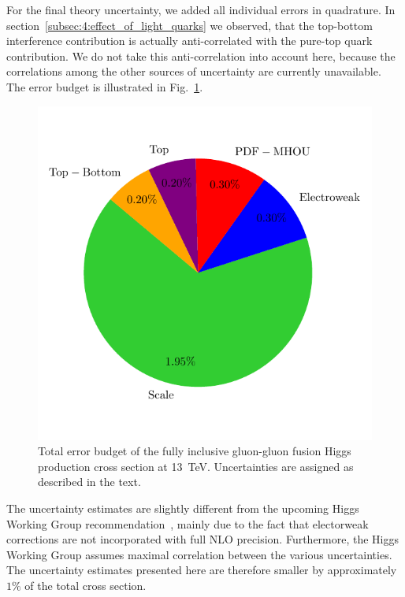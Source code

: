 For the final theory uncertainty, we added all individual errors in quadrature. In section~\ref{subsec:4:effect_of_light_quarks} we observed, that the top-bottom interference contribution is actually anti-correlated with the pure-top quark contribution. We do not take this anti-correlation into account here, because the correlations among the other sources of uncertainty are currently unavailable. The error budget is illustrated in Fig.~\ref{fig:6:error_budget}.
\begin{figure}[h]
\centering
\includegraphics[scale=0.8]{Images/error_budget_after.pdf}
\caption{Total error budget of the fully inclusive gluon-gluon fusion Higgs production cross section at 13~TeV. Uncertainties are assigned as described in the text.}
\label{fig:6:error_budget}
\end{figure}

The uncertainty estimates are slightly different from the upcoming Higgs Working Group recommendation~\cite{Cappati:2024}, mainly due to the fact that electorweak corrections are not incorporated with full \acs{NLO} precision. Furthermore, the Higgs Working Group assumes maximal correlation between the various uncertainties. The uncertainty estimates presented here are therefore smaller by approximately $1\%$ of the total cross section.

